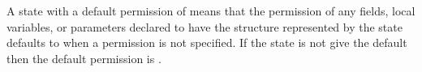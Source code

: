 A state with a default permission of  means that the permission of any fields,
local variables, or parameters declared to have the structure represented
by the state defaults to  when a permission
is not specified.  If the state is not give the default 
then the default permission is .


